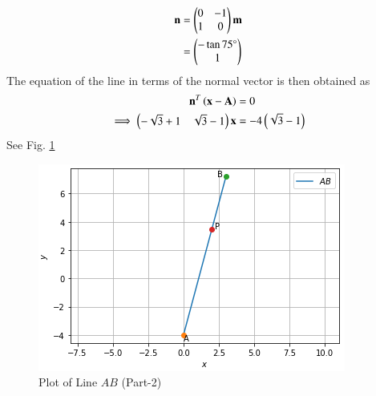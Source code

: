 \begin{enumerate}
    \begin{align}
    \label{linform/2/14/eq:line_norm_dir}
    \mathbf{n} &= \begin{pmatrix}0&-1\\1&0\end{pmatrix}\mathbf{m} 
    \\
    &= \begin{pmatrix}-\tan75\degree\\1\end{pmatrix}
    \end{align}
    The equation of the line in terms of the normal vector is then obtained as
    \begin{align}
    \label{linform/2/14/eq:line_norm_vec}
    \mathbf{n}^T\left(\mathbf{x}-\mathbf{A}\right) &= 0
    \\
    \implies \begin{pmatrix}-\sqrt{3}+1 &\sqrt{3}-1\end{pmatrix}  \mathbf{x} &= -4\left(\sqrt{3}-1\right)
    \end{align}
    See Fig. \ref{linform/2/14/Plot of Line $AB$ (Part-2)}

    \begin{figure}[ht]
    \centering
    \includegraphics[width=\columnwidth]{solutions/su2021/2/14/Line_Plot_Part2.PNG}
    \caption{Plot of Line $AB$ (Part-2)}
    \label{linform/2/14/Plot of Line $AB$ (Part-2)}
    \end{figure}
\end{enumerate}